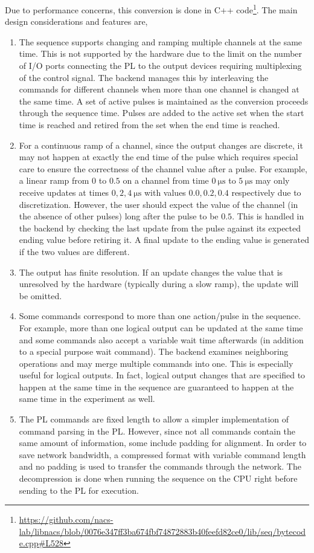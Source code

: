 Due to performance concerns, this conversion is done in C++ code\footnote{\url{https://github.com/nacs-lab/libnacs/blob/0076e347ff3ba674fbf74872883b40feefd82ce0/lib/seq/bytecode.cpp\#L528}}.
The main design considerations and features are,
\begin{enumerate}
\item The sequence supports changing and ramping multiple channels at the same time.
  This is not supported by the hardware due to the limit on the number of I/O ports
  connecting the PL to the output devices requiring multiplexing of the control signal.
  The backend manages this by interleaving the commands for different channels
  when more than one channel is changed at the same time.
  A set of active pulses is maintained as the conversion proceeds through the sequence time.
  Pulses are added to the active set when the start time is reached
  and retired from the set when the end time is reached.
\item For a continuous ramp of a channel, since the output changes are discrete,
  it may not happen at exactly the end time of the pulse
  which requires special care to ensure the correctness of the channel value after a pulse.
  For example, a linear ramp from $0$ to $0.5$ on a channel from time $0~\mathrm{\mu s}$
  to $5~\mathrm{\mu s}$ may only receive updates at times $0, 2, 4~\mathrm{\mu s}$
  with values $0.0, 0.2, 0.4$ respectively due to discretization.
  However, the user should expect the value of the channel (in the absence of other pulses)
  long after the pulse to be $0.5$.
  This is handled in the backend by checking the last update from the pulse
  against its expected ending value before retiring it.
  A final update to the ending value is generated if the two values are different.
\item The output has finite resolution.
  If an update changes the value that is unresolved by the hardware
  (typically during a slow ramp), the update will be omitted.
\item Some commands correspond to more than one action/pulse in the sequence.
  For example, more than one logical output can be updated at the same time
  and some commands also accept a variable wait time afterwards
  (in addition to a special purpose wait command).
  The backend examines neighboring operations and may merge multiple commands into one.
  This is especially useful for logical outputs.
  In fact, logical output changes that are specified to happen at the same time in the sequence
  are guaranteed to happen at the same time in the experiment as well.
\item The PL commands are fixed length to allow a simpler implementation
  of command parsing in the PL.
  However, since not all commands contain the same amount of information,
  some include padding for alignment.
  In order to save network bandwidth, a compressed format with variable command length
  and no padding is used to transfer the commands through the network.
  The decompression is done when running the sequence on the CPU right before
  sending to the PL for execution.
\end{enumerate}

